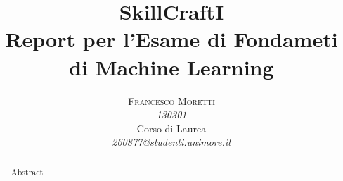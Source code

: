 \documentclass[12pt,a4paper]{article}
\begin{document}
\title{SkillCraftI\\
\Large{Report per l'Esame di Fondameti di Machine Learning}
}%
\author{\textsc{Francesco Moretti} \\
    \emph{130301} \\
    Corso di Laurea\\
    \emph{260877@studenti.unimore.it}
  }
\date{}
\maketitle
\clearpage

\tableofcontents{}
\clearpage

\begin{abstract}
\normalsize
Abstract 


\end{abstract}
\clearpage







\clearpage
{}

\end{document}
